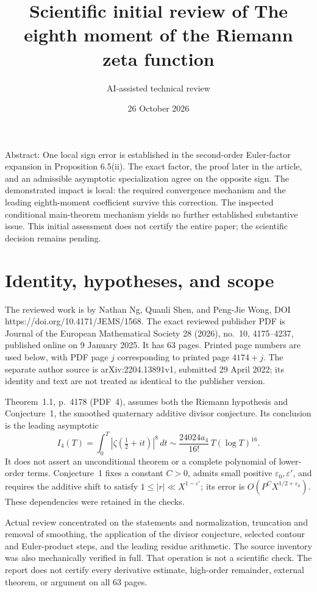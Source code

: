 \documentclass[10pt]{article}
\title{Scientific initial review of
The eighth moment of the Riemann zeta function}
\author{AI-assisted technical review}
\date{26 October 2026}
\begin{document}
\maketitle
Abstract: One local sign error is established in the second-order Euler-factor expansion in Proposition 6.5(ii). The exact factor, the proof later in the article, and an admissible asymptotic specialization agree on the opposite sign. The demonstrated impact is local: the required convergence mechanism and the leading eighth-moment coefficient survive this correction. The inspected conditional main-theorem mechanism yields no further established substantive issue. This initial assessment does not certify the entire paper; the scientific decision remains pending.\par
\section*{Identity, hypotheses, and scope}
The reviewed work is by Nathan Ng, Quanli Shen, and Peng-Jie Wong, DOI https://doi.org/10.4171/JEMS/1568. The exact reviewed publisher PDF is Journal of the European Mathematical Society 28 (2026), no. 10, 4175–4237, published online on 9 January 2025. It has 63 pages. Printed page numbers are used below, with PDF page \(j\) corresponding to printed page \(4174+j\). The separate author source is arXiv:2204.13891v1, submitted 29 April 2022; its identity and text are not treated as identical to the publisher version.\par
Theorem 1.1, p. 4178 (PDF 4), assumes both the Riemann hypothesis and Conjecture 1, the smoothed quaternary additive divisor conjecture. Its conclusion is the leading asymptotic \[I_4(T)=\int_0^T|\zeta(\tfrac12+it)|^8\,dt
\sim \frac{24024a_4}{16!}\,T(\log T)^{16}.\] It does not assert an unconditional theorem or a complete polynomial of lower-order terms. Conjecture 1 fixes a constant \(C>0\), admits small positive \(\varepsilon_0,\varepsilon'\), and requires the additive shift to satisfy \(1\le |r|\ll X^{1-\varepsilon'}\); its error is \(O(P^CX^{1/2+\varepsilon_0})\). These dependencies were retained in the checks.\par
Actual review concentrated on the statements and normalization, truncation and removal of smoothing, the application of the divisor conjecture, selected contour and Euler-product steps, and the leading residue arithmetic. The source inventory was also mechanically verified in full. That operation is not a scientific check. The report does not certify every derivative estimate, high-order remainder, external theorem, or argument on all 63 pages.\par
\end{document}
